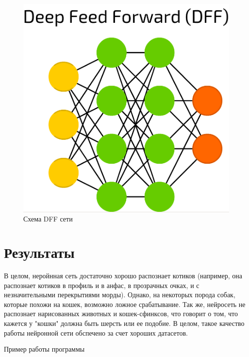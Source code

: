 \documentclass{article}
\begin{document}
\begin{figure}[h!]
    \centering
    \includegraphics[scale=0.1]{model.png}
    \caption{Схема DFF сети}
    \label{fig:model}
\end{figure}

\section{Результаты}

В целом, неройнная сеть достаточно хорошо распознает котиков (например, она распознает котиков в профиль и в анфас, в прозрачных очках, и с незначительными перекрытиями морды). Однако, на некоторых порода собак, которые похожи на кошек, возможно ложное срабатывание. Так же, нейросеть не распознает нарисованных животных и кошек-сфинксов, что говорит о том, что кажется у "кошки" должна быть шерсть или ее подобие. В целом, такое качество работы нейронной сети обспечено за счет хороших датасетов.

Пример работы программы
\end{document}
